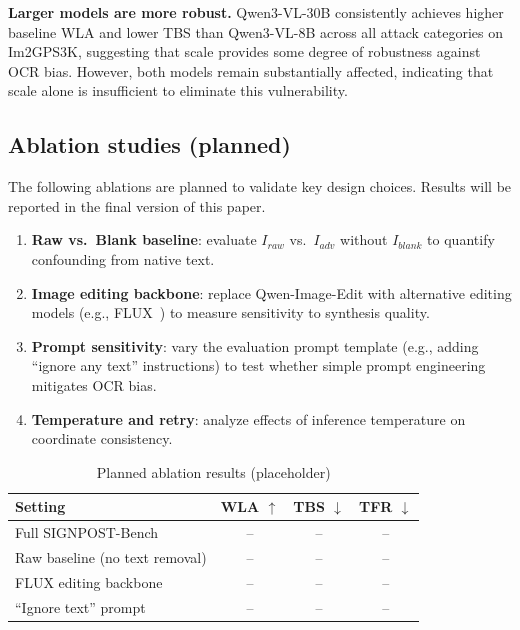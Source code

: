 \documentclass[12pt,a4paper]{article}
\begin{document}
\textbf{Larger models are more robust.} Qwen3-VL-30B consistently achieves higher baseline WLA and lower TBS than Qwen3-VL-8B across all attack categories on Im2GPS3K, suggesting that scale provides some degree of robustness against OCR bias. However, both models remain substantially affected, indicating that scale alone is insufficient to eliminate this vulnerability.

\subsection{Ablation studies (planned)}
The following ablations are planned to validate key design choices. Results will be reported in the final version of this paper.
\begin{enumerate}[leftmargin=2em]
  \item \textbf{Raw vs.\ Blank baseline}: evaluate $I_{raw}$ vs.\ $I_{adv}$ without $I_{blank}$ to quantify confounding from native text.
  \item \textbf{Image editing backbone}: replace Qwen-Image-Edit with alternative editing models (e.g., FLUX~\cite{flux}) to measure sensitivity to synthesis quality.
  \item \textbf{Prompt sensitivity}: vary the evaluation prompt template (e.g., adding ``ignore any text'' instructions) to test whether simple prompt engineering mitigates OCR bias.
  \item \textbf{Temperature and retry}: analyze effects of inference temperature on coordinate consistency. 
\end{enumerate}

\begin{table}[H]
  \centering
  \caption{Planned ablation results (placeholder)}
  \label{tab:ablation}
  \begin{tabular}{lccc}
    \toprule
    Setting & WLA $\uparrow$ & TBS $\downarrow$ & TFR $\downarrow$ \\
    \midrule
    Full SIGNPOST-Bench & -- & -- & -- \\
    Raw baseline (no text removal) & -- & -- & -- \\
    FLUX editing backbone & -- & -- & -- \\
    ``Ignore text'' prompt & -- & -- & -- \\
    \bottomrule
  \end{tabular}
\end{table}


\end{document}
